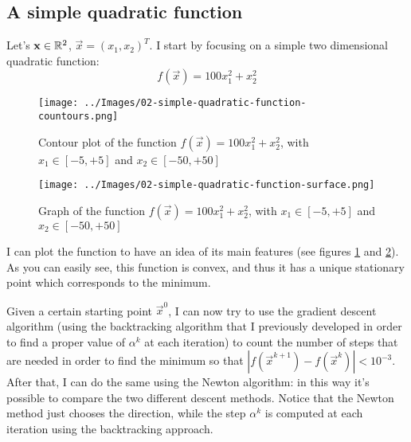     \subsection{A simple quadratic function}
        Let's \(\mathbf{x} \in \mathbb{R}^2\), \(\vec{x} = (x_1, x_2)^T\). I start by focusing on a simple two dimensional quadratic function:
        \[f(\vec{x}) = 100x_1^2 + x_2^2\]
        \begin{figure}
            \centering
            \texttt{[image: ../Images/02-simple-quadratic-function-countours.png]}
            \caption{Contour plot of the function \(f(\vec{x}) = 100x_1^2 + x_2^2\), with \(x_1 \in [-5, +5]\) and \(x_2 \in [-50, +50]\)}
            \label{simple-quadratic-function-countours}
        \end{figure}
        \begin{figure}
            \centering
            \texttt{[image: ../Images/02-simple-quadratic-function-surface.png]}
            \caption{Graph of the function \(f(\vec{x}) = 100x_1^2 + x_2^2\), with \(x_1 \in [-5, +5]\) and \(x_2 \in [-50, +50]\)}
            \label{simple-quadratic-function-surface}
        \end{figure}
        I can plot the function to have an idea of its main features (see figures \ref{simple-quadratic-function-countours} and \ref{simple-quadratic-function-surface}). As you can easily see, this function is convex, and thus it has a unique stationary point which corresponds to the minimum.\par
        Given a certain starting point \(\vec{x}^0\), I can now try to use the gradient descent algorithm (using the backtracking algorithm that I previously developed in order to find a proper value of \(\alpha^k\) at each iteration) to count the number of steps that are needed in order to find the minimum so that \(|f(\vec{x}^{k+1}) - f(\vec{x}^k)| < 10^{-3}\). After that, I can do the same using the Newton algorithm: in this way it's possible to compare the two different descent methods. Notice that the Newton method just chooses the direction, while the step \(\alpha^k\) is computed at each iteration using the backtracking approach.
